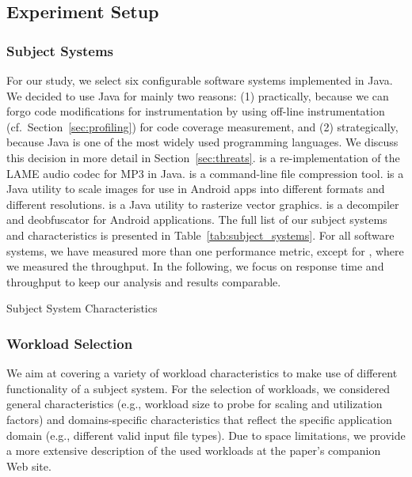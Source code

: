 
\subsection{Experiment Setup}\label{sec:setup}
\subsubsection{Subject Systems}
For our study, we select six configurable software systems implemented in Java. We decided to use Java for mainly two reasons: (1) practically, because we can forgo code modifications for instrumentation by using off-line instrumentation (cf.~Section~\ref{sec:profiling}) for code coverage measurement, and (2) strategically, because Java is one of the most widely used programming languages. We discuss this decision in more detail in Section~\ref{sec:threats}. 
\jumper is a re-implementation of the LAME audio codec for MP3 in Java. \kanzi is a command-line file compression tool. \dconvert is a Java utility to scale images for use in Android apps into different formats and different resolutions. \batik is a Java utility to rasterize vector graphics. \jadx is a decompiler and deobfuscator for Android applications. The full list of our subject systems and characteristics is presented in Table~\ref{tab:subject_systems}. 
For all software systems, we have measured more than one performance metric, except for \htwo, where we measured the throughput.  In the following, we focus on response time and throughput to keep our analysis and results comparable.

\begin{table}[h]
	\footnotesize
	\centering
	\caption{Subject System Characteristics}
	
	\label{tab:subject_systems}
\end{table}

\subsubsection{Workload Selection}
We aim at covering a variety of workload characteristics to make use of different functionality of a subject system. 
For the selection of workloads, we considered general characteristics (e.g., workload size to probe for scaling and utilization factors) and domains-specific characteristics that reflect the specific application domain (e.g., different valid input file types).
Due to space limitations, we provide a more extensive description of the used workloads at the paper's companion Web site.

